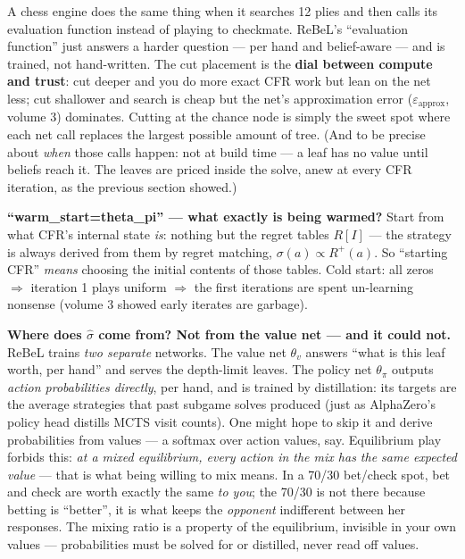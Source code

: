 \documentclass[11pt,a4paper]{article}
\begin{document}
A chess engine does the same thing when it searches 12 plies and then calls
its evaluation function instead of playing to checkmate. ReBeL's
``evaluation function'' just answers a harder question --- per hand and
belief-aware --- and is trained, not hand-written. The cut placement is the
\textbf{dial between compute and trust}: cut deeper and you do more exact
CFR work but lean on the net less; cut shallower and search is cheap but the
net's approximation error ($\varepsilon_{\mathrm{approx}}$, volume 3)
dominates. Cutting at the chance node is simply the sweet spot where each
net call replaces the largest possible amount of tree. (And to be precise
about \emph{when} those calls happen: not at build time --- a leaf has no
value until beliefs reach it. The leaves are priced inside the solve, anew
at every CFR iteration, as the previous section showed.)

\textbf{``warm\_start=theta\_pi'' --- what exactly is being warmed?}
Start from what CFR's internal state \emph{is}: nothing but the regret
tables $R[I]$ --- the strategy is always derived from them by regret
matching, $\sigma(a) \propto R^{+}(a)$. So ``starting CFR'' \emph{means}
choosing the initial contents of those tables. Cold start: all zeros
$\Rightarrow$ iteration 1 plays uniform $\Rightarrow$ the first iterations
are spent un-learning nonsense (volume 3 showed early iterates are garbage).

\begin{trap}
\textbf{Where does $\hat\sigma$ come from? Not from the value net --- and it
could not.} ReBeL trains \emph{two separate} networks. The value net
$\theta_v$ answers ``what is this leaf worth, per hand'' and serves the
depth-limit leaves. The policy net $\theta_\pi$ outputs \emph{action
probabilities directly}, per hand, and is trained by distillation: its
targets are the average strategies that past subgame solves produced (just
as AlphaZero's policy head distills MCTS visit counts). One might hope to
skip it and derive probabilities from values --- a softmax over action
values, say. Equilibrium play forbids this: \emph{at a mixed equilibrium,
every action in the mix has the same expected value} --- that is what being
willing to mix means. In a 70/30 bet/check spot, bet and check are worth
exactly the same \emph{to you}; the 70/30 is not there because betting is
``better'', it is what keeps the \emph{opponent} indifferent between her
responses. The mixing ratio is a property of the equilibrium, invisible in
your own values --- probabilities must be solved for or distilled, never
read off values.
\end{trap}
\end{document}
